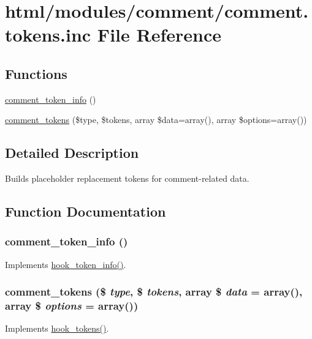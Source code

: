 \hypertarget{comment_8tokens_8inc}{
\section{html/modules/comment/comment.tokens.inc File Reference}
\label{comment_8tokens_8inc}
}
\subsection*{Functions}
\begin{DoxyCompactItemize}
\item 
\hyperlink{comment_8tokens_8inc_a4dd52fd442bc2cce33d5f48249b3c0da}{comment\_\-token\_\-info} ()
\item 
\hyperlink{comment_8tokens_8inc_a9a0319b11b01abf46c861814265cc19d}{comment\_\-tokens} (\$type, \$tokens, array \$data=array(), array \$options=array())
\end{DoxyCompactItemize}


\subsection{Detailed Description}
Builds placeholder replacement tokens for comment-\/related data. 

\subsection{Function Documentation}
\hypertarget{comment_8tokens_8inc_a4dd52fd442bc2cce33d5f48249b3c0da}{
\subsubsection[{comment\_\-token\_\-info}]{\setlength{\rightskip}{0pt plus 5cm}comment\_\-token\_\-info ()}}
\label{comment_8tokens_8inc_a4dd52fd442bc2cce33d5f48249b3c0da}
Implements \hyperlink{group__hooks_gab868597197cf36911f95dcd29ae0b954}{hook\_\-token\_\-info()}. \hypertarget{comment_8tokens_8inc_a9a0319b11b01abf46c861814265cc19d}{
\subsubsection[{comment\_\-tokens}]{\setlength{\rightskip}{0pt plus 5cm}comment\_\-tokens (\$ {\em type}, \/  \$ {\em tokens}, \/  array \$ {\em data} = {\ttfamily array()}, \/  array \$ {\em options} = {\ttfamily array()})}}
\label{comment_8tokens_8inc_a9a0319b11b01abf46c861814265cc19d}
Implements \hyperlink{group__hooks_ga3bfd87d9a19b2397b0f970e1cff7ea4f}{hook\_\-tokens()}. 